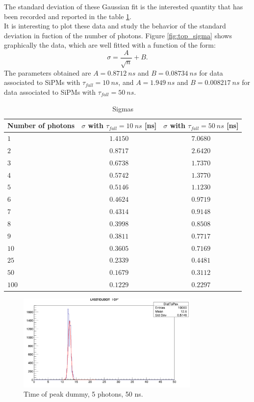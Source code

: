 The standard deviation of these Gaussian fit is the interested quantity that has been recorded and reported in the table \ref{tab:sigmas}.\\
It is interesting to plot these data and study the behavior of the standard deviation in fuction of the number of photons. Figure \ref{fig:top_sigma} shows graphically the data, which are well fitted with a function of the form:
\begin{equation}
	\sigma = \frac{A}{\sqrt{n}} + B.
\end{equation}
The parameters obtained are $A = 0.8712\ ns$ and $B = 0.08734\ ns$ for data associated to SiPMs with $\tau_{fall}=10\ ns$, and $A = 1.949\ ns$ and $B = 0.008217\ ns$ for data associated to SiPMs with $\tau_{fall}=50\ ns$.

\begin{table}
	\centering
	\begin{tabular}{lcc}
		\toprule
		Number of photons	& $\sigma$ with $\tau_{fall}=10\ ns$ [ns] & $\sigma$ with $\tau_{fall}=50\ ns$ [ns]	\\
		\midrule
		$1$ 	& $1.4150$ & $7.0680$ \\
		$2$ 	& $0.8717$ & $2.6420$ \\
		$3$ 	& $0.6738$ & $1.7370$ \\
		$4$ 	& $0.5742$ & $1.3770$ \\
		$5$ 	& $0.5146$ & $1.1230$ \\
		$6$ 	& $0.4624$ & $0.9719$ \\
		$7$ 	& $0.4314$ & $0.9148$ \\
		$8$ 	& $0.3998$ & $0.8508$ \\
		$9$ 	& $0.3811$ & $0.7717$ \\
		$10$ 	& $0.3605$ & $0.7169$ \\
		$25$ 	& $0.2339$ & $0.4481$ \\
		$50$ 	& $0.1679$ & $0.3112$ \\
		$100$ 	& $0.1229$ & $0.2297$ \\
		\bottomrule
	\end{tabular}
	\caption{Sigmas}
	\label{tab:sigmas}
\end{table}

\begin{figure}
	\centering
	\includegraphics[width=0.8\textwidth]{IMG/top_dummy}
	\caption{Time of peak dummy, 5 photons, 50 ns.}
	\label{fig:top_dummy}
\end{figure}


